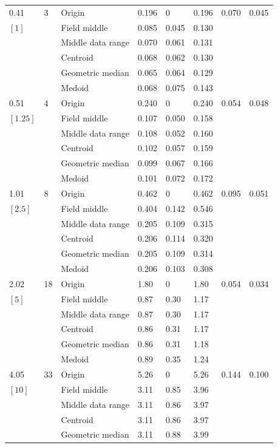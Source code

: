 \documentclass[phd,showframe]{ndsu-thesis-2022}
\begin{document}
{{\begin{longtable}{lll lll ll}
0.41 & 3 & Origin  & 0.196 & 0 & 0.196 & 0.070 & 0.045 \\
$[1]$ &  & Field middle  & 0.085 & 0.045 & 0.130 \\
 &  & Middle data range  & 0.070 & 0.061 & 0.131 \\
 &  & Centroid & 0.068 & 0.062 & 0.130 \\
 &  & Geometric median & 0.065 & 0.064 & 0.129 \\
 &  & Medoid  & 0.068 & 0.075 & 0.143 \\
\midrule
0.51 & 4 & Origin  & 0.240 & 0 & 0.240 & 0.054 & 0.048 \\
$[1.25]$ &  & Field middle  & 0.107 & 0.050 & 0.158 \\
 &  & Middle data range  & 0.108 & 0.052 & 0.160 \\
 &  & Centroid & 0.102 & 0.057 & 0.159 \\
 &  & Geometric median & 0.099 & 0.067 & 0.166 \\
 &  & Medoid  & 0.101 & 0.072 & 0.172 \\
\midrule
1.01 & 8 & Origin  & 0.462 & 0 & 0.462 & 0.095 & 0.051 \\
$[2.5]$ &  & Field middle  & 0.404 & 0.142 & 0.546 \\
 &  & Middle data range  & 0.205 & 0.109 & 0.315 \\
 &  & Centroid & 0.206 & 0.114 & 0.320 \\
 &  & Geometric median & 0.205 & 0.109 & 0.314 \\
 &  & Medoid  & 0.206 & 0.103 & 0.308 \\
\midrule
2.02 & 18 & Origin  & 1.80 & 0 & 1.80 & 0.054 & 0.034 \\
$[5]$ &  & Field middle  & 0.87 & 0.30 & 1.17 \\
 &  & Middle data range  & 0.87 & 0.30 & 1.17 \\
 &  & Centroid & 0.86 & 0.31 & 1.17 \\
 &  & Geometric median & 0.86 & 0.31 & 1.18 \\
 &  & Medoid  & 0.89 & 0.35 & 1.24 \\
\midrule
4.05 & 33 & Origin  & 5.26 & 0 & 5.26 & 0.144 & 0.100 \\
$[10]$ &  & Field middle  & 3.11 & 0.85 & 3.96 \\
 &  & Middle data range  & 3.11 & 0.86 & 3.97 \\
 &  & Centroid & 3.11 & 0.86 & 3.97 \\
 &  & Geometric median & 3.11 & 0.88 & 3.99 \\

\end{longtable}}}
\end{document}
